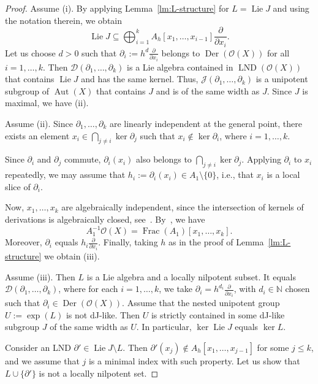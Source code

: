 \documentclass[12pt,a4paper]{amsart}
\theoremstyle{plain}
\theoremstyle{definition}
\theoremstyle{remark}
\def\Aut{\operatorname{Aut}}
\def\Der{\operatorname{Der}}
\def\LND{\operatorname{LND}}
\def\Frac{\operatorname{Frac}}
\def\Lie{\operatorname{Lie}}
\def\NN{{\mathbb N}}
\def\cO{{\mathcal O}}
\def\J{{\mathcal J}}
\begin{document}
\begin{proof}
   Assume (i).
   By applying Lemma~\ref{lm:L-structure} for $L=\Lie J$  and using the notation therein, we obtain
   \[
      \Lie J \subseteq \bigoplus_{i=1}^k A_h[x_1,\ldots,x_{i-1}]\frac{\partial}{\partial x_i}.
   \]
   Let us choose $d>0$ such that $\partial_i:=h^d \frac{\partial}{\partial x_i}$ belongs to $\Der(\cO(X))$ for all $i=1,\ldots,k$. Then $\mathcal{D}(\partial_1,\ldots,\partial_k)$ is a Lie algebra contained in $\LND(\cO(X))$ that contains $\Lie J$ and has the same kernel.
   Thus, $\J(\partial_1,\ldots,\partial_k)$ is a unipotent subgroup of $\Aut(X)$ that contains $J$ and is of the same width as $J$. 
   Since $J$ is maximal, we have (ii). 

   Assume (ii). 
   Since $\partial_1,\ldots,\partial_k$ are linearly independent at the general point, 
   there exists an element  $x_i\in\bigcap_{j\neq i}\ker\partial_j$ such that $x_i\notin\ker\partial_i$, where $i=1,\ldots,k$.

   Since $\partial_i$ and $\partial_j$ commute, $\partial_i(x_i)$ also belongs to $\bigcap_{j\neq i}\ker\partial_j$. 
   Applying $\partial_i$ to $x_i$ repeatedly, we may assume that $h_i:=\partial_i(x_i)\in A_1\setminus\{0\}$, i.e., that $x_i$ is a local slice of $\partial_i$.
   
   Now, $x_1,\ldots,x_k$ are algebraically independent, since the intersection of kernels of derivations is algebraically closed, see~\cite[Proposition 1.9.(d)]{Freudenburg}.
   By~\cite[Proposition 4.6]{DerksenLND}, we have 
   \[A_1^{-1}\cO(X)=\Frac(A_1)[x_1,\ldots,x_k].\]
   Moreover, $\partial_i$ equals $h_i\frac{\partial}{\partial x_i}$.
   Finally, taking $h$ as in the proof of Lemma~\ref{lm:L-structure} we obtain (iii).


   Assume (iii). Then $L$ is a Lie algebra and a locally nilpotent subset.
   It equals $\mathcal{D}(\partial_1,\ldots,\partial_k)$, where for each $i=1,\ldots,k$, we take $\partial_i=h^{d_i} \frac{\partial}{\partial x_i}$, with $d_i\in\NN$ chosen such that $\partial_i\in\Der(\cO(X))$.
   Assume that the nested unipotent group $U:=\exp(L)$ is not dJ-like.
   Then $U$ is strictly contained in some dJ-like subgroup $J$ of the same width as $U$.
   In particular, $\ker\Lie J$ equals $\ker L$.
   
   Consider an LND $\partial'\in\Lie J\setminus L$.
   Then $\partial'(x_j)\notin A_h[x_1,\ldots,x_{j-1}]$ for some $j\le k$, 
   and we assume that $j$ is a minimal index with such property. 
   Let us show that $L \cup\{\partial'\}$ is not a locally nilpotent set.


\end{proof}
\end{document}
